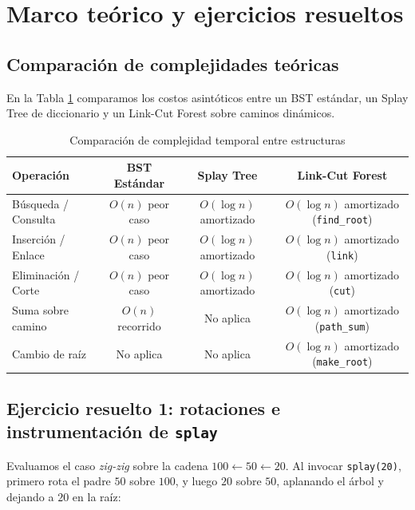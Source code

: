 \section{Marco teórico y ejercicios resueltos}

\subsection{Comparación de complejidades teóricas}
En la Tabla \ref{tab:complejidad_teorica} comparamos los costos asintóticos entre un BST estándar, un Splay Tree de diccionario y un Link-Cut Forest sobre caminos dinámicos.

\begin{table}[H]
    \caption{Comparación de complejidad temporal entre estructuras}
    \label{tab:complejidad_teorica}
    \centering
    \footnotesize
    \begin{tabular*}{\textwidth}{@{\extracolsep{\fill}}lccc}
        \toprule
        \textbf{Operación} & \textbf{BST Estándar} & \textbf{Splay Tree} & \textbf{Link-Cut Forest} \\
        \midrule
        Búsqueda / Consulta & $O(n)$ peor caso & $O(\log n)$ amortizado & $O(\log n)$ amortizado (\texttt{find\_root}) \\
        Inserción / Enlace  & $O(n)$ peor caso & $O(\log n)$ amortizado & $O(\log n)$ amortizado (\texttt{link}) \\
        Eliminación / Corte & $O(n)$ peor caso & $O(\log n)$ amortizado & $O(\log n)$ amortizado (\texttt{cut}) \\
        Suma sobre camino   & $O(n)$ recorrido & No aplica & $O(\log n)$ amortizado (\texttt{path\_sum}) \\
        Cambio de raíz      & No aplica        & No aplica & $O(\log n)$ amortizado (\texttt{make\_root}) \\
        \bottomrule
    \end{tabular*}
\end{table}

\subsection{Ejercicio resuelto 1: rotaciones e instrumentación de \texttt{splay}}
Evaluamos el caso \textit{zig-zig} sobre la cadena $100 \leftarrow 50 \leftarrow 20$. Al invocar \texttt{splay(20)}, primero rota el padre $50$ sobre $100$, y luego $20$ sobre $50$, aplanando el árbol y dejando a $20$ en la raíz:

